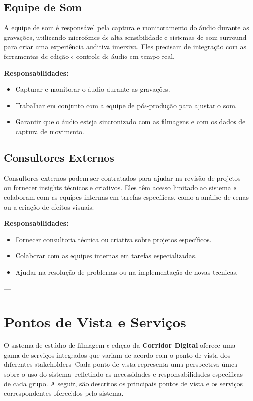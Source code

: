 \subsection{Equipe de Som}
A equipe de som é responsável pela captura e monitoramento do áudio durante as gravações, utilizando microfones de alta sensibilidade e sistemas de som surround para criar uma experiência auditiva imersiva. Eles precisam de integração com as ferramentas de edição e controle de áudio em tempo real.

\textbf{Responsabilidades:}
\begin{itemize}
  \item Capturar e monitorar o áudio durante as gravações.
  \item Trabalhar em conjunto com a equipe de pós-produção para ajustar o som.
  \item Garantir que o áudio esteja sincronizado com as filmagens e com os dados de captura de movimento.
\end{itemize}

\subsection{Consultores Externos}
Consultores externos podem ser contratados para ajudar na revisão de projetos ou fornecer insights técnicos e criativos. Eles têm acesso limitado ao sistema e colaboram com as equipes internas em tarefas específicas, como a análise de cenas ou a criação de efeitos visuais.

\textbf{Responsabilidades:}
\begin{itemize}
  \item Fornecer consultoria técnica ou criativa sobre projetos específicos.
  \item Colaborar com as equipes internas em tarefas especializadas.
  \item Ajudar na resolução de problemas ou na implementação de novas técnicas.
\end{itemize}

---



\section{Pontos de Vista e Serviços}

O sistema de estúdio de filmagem e edição da \textbf{Corridor Digital} oferece uma gama de serviços integrados que variam de acordo com o ponto de vista dos diferentes stakeholders. Cada ponto de vista representa uma perspectiva única sobre o uso do sistema, refletindo as necessidades e responsabilidades específicas de cada grupo. A seguir, são descritos os principais pontos de vista e os serviços correspondentes oferecidos pelo sistema.

